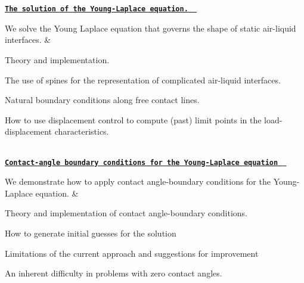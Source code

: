 \begin{longtabu}
\\
\\
\href{../../young_laplace/young_laplace/html/index.html}{\tt {\bfseries The solution of the Young-\/\+Laplace equation. } }

We solve the Young Laplace equation that governs the shape of static air-\/liquid interfaces.  &
\begin{DoxyItemize}
\item Theory and implementation.
\item The use of spines for the representation of complicated air-\/liquid interfaces.
\item Natural boundary conditions along free contact lines.
\item How to use displacement control to compute (past) limit points in the load-\/displacement characteristics. 
\end{DoxyItemize}

\\
\href{../../young_laplace/contact_angle/html/index.html}{\tt {\bfseries  Contact-\/angle boundary conditions for the Young-\/\+Laplace equation } }

We demonstrate how to apply contact angle-\/boundary conditions for the Young-\/\+Laplace equation.  &
\begin{DoxyItemize}
\item Theory and implementation of contact angle-\/boundary conditions.
\item How to generate initial guesses for the solution
\item Limitations of the current approach and suggestions for improvement
\item An inherent difficulty in problems with zero contact angles. 
\end{DoxyItemize}



\\
\end{longtabu}
\tabulinesep=1mm
